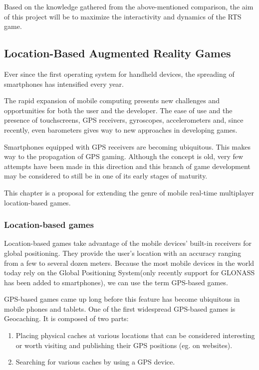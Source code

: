 \documentclass{article}
\begin{document}
Based on the knowledge gathered from the above-mentioned comparison, the aim of
this project will be to maximize the interactivity and dynamics of the RTS game.


\subsection{Location-Based Augmented Reality Games}

Ever since the first operating system for handheld devices, the spreading of
smartphones has intensified every year.\newline

The rapid expansion of mobile computing presents new challenges and
opportunities for both the user and the developer. The ease of use and the
presence of touchscreens, GPS receivers, gyroscopes, accelerometers and, since
recently, even barometers gives way to new approaches in developing
games.\newline

Smartphones equipped with GPS receivers are becoming ubiquitous. This makes way
to the propagation of GPS gaming. Although the concept is old, very few attempts
have been made in this direction and this branch of game development may be
considered to still be in one of its early stages of maturity.\newline

This chapter is a proposal for extending the genre of mobile real-time
multiplayer location-based games.

\subsubsection{Location-based games}
Location-based games take advantage of the mobile devices' built-in receivers
for global positioning. They provide the user's location with an accuracy
ranging from a few to several dozen meters. Because the most mobile devices in
the world today rely on the Global Positioning System(only recently support for
GLONASS has been added to smartphones), we can use the term GPS-based
games.\newline

GPS-based games came up long before this feature has become ubiquitous in mobile
phones and tablets. One of the first widespread GPS-based games is Geocaching.
It is composed of two parts: 
\begin{enumerate}
  \item Placing physical caches at various locations that can be considered
  interesting or worth visiting and publishing their GPS positions (eg. on
  websites).
  \item Searching for various caches by using a GPS device.
\end{enumerate}
\end{document}
